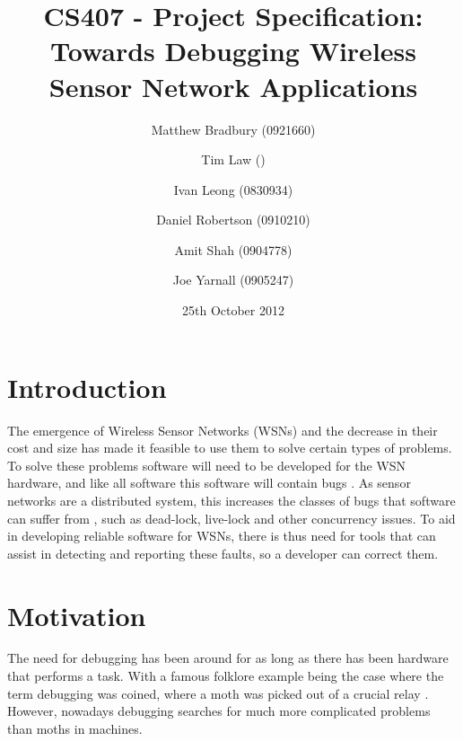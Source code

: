 \documentclass[a4paper]{article}
\title{CS407 - Project Specification:\\
Towards Debugging Wireless Sensor Network Applications}
\date{25th October 2012}
\author{
	Matthew Bradbury (0921660) \and
	Tim Law () \and
	Ivan Leong (0830934) \and
	Daniel Robertson (0910210) \and
	Amit Shah (0904778) \and
	Joe Yarnall (0905247)
}
\begin{document}
\maketitle

\pagestyle{empty}
\thispagestyle{empty}

\newpage

\pagestyle{plain}
\setcounter{page}{1}

\tableofcontents
\clearpage


\section{Introduction}

The emergence of Wireless Sensor Networks (WSNs) and the decrease in their cost and size has made it feasible to use them to solve certain types of problems. To solve these problems software will need to be developed for the WSN hardware, and like all software this software will contain bugs \cite{5010224}. As sensor networks are a distributed system, this increases the classes of bugs that software can suffer from \cite{5010224}, such as dead-lock, live-lock and other concurrency issues. To aid in developing reliable software for WSNs, there is thus need for tools that can assist in detecting and reporting these faults, so a developer can correct them.

\section{Motivation}

The need for debugging has been around for as long as there has been hardware that performs a task. With a famous folklore example being the case where the term debugging was coined, where a moth was picked out of a crucial relay \cite{shapiro1987etymology}. However, nowadays debugging searches for much more complicated problems than moths in machines.
\end{document}
